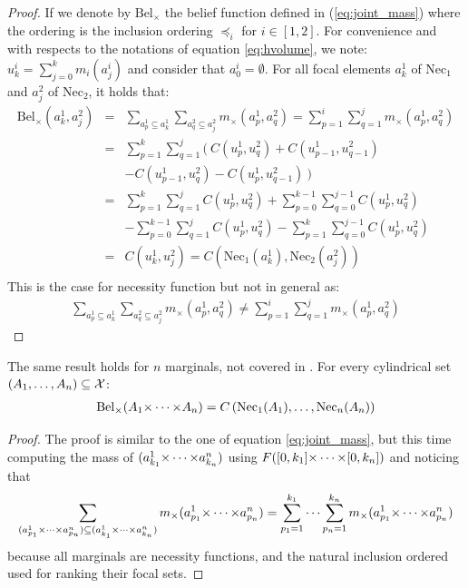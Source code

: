 \begin{proof}
    If we denote by $\mathrm{Bel}_\times$ the belief function defined in (\ref{eq:joint_mass}) where the ordering is the inclusion ordering $\preceq_i$ for $i\in[1,2]$. For convenience and with respects to the notations of equation \ref{eq:hvolume}, we note: $u^i_k=\sum_{j=0}^{k}m_i(a_j^i)$ and consider that $a^i_0=\emptyset$.
    For all focal elements $a_k^1$ of $\mathrm{Nec}_1$ and $a^2_j$ of $\mathrm{Nec}_2$, it holds that:
    \begin{eqnarray*}
        \mathrm{Bel}_\times(a^1_k, a^2_j) &=& \sum_{a^1_p\subseteq a_k^1}\sum_{a^2_q\subseteq a_j^2}m_\times(a^1_p, a^2_q) = \sum_{p=1}^i\sum_{q=1}^j m_\times(a^1_p, a^2_q)\\
        &=&\sum_{p=1}^k\sum_{q=1}^j (~C(u^1_p, u^2_q) + C(u^1_{p-1}, u^2_{q-1}) \\
        &&- C(u^1_{p-1}, u^2_{q}) - C(u^1_{p}, u^2_{q-1})~)\\
        &=&\sum_{p=1}^k\sum_{q=1}^jC(u^1_p, u^2_q) + \sum_{p=0}^{k-1}\sum_{q=0}^{j-1}C(u^1_p, u^2_q) \\
        &&- \sum_{p=0}^{k-1}\sum_{q=1}^jC(u^1_p, u^2_q) - \sum_{p=1}^k\sum_{q=0}^{j-1}C(u^1_p, u^2_q)\\
        &=& C(u^1_k, u^2_j) = C\left(\mathrm{Nec}_1(a_k^1), \mathrm{Nec}_2(a_j^2)\right)\\
    \end{eqnarray*}
    This is the case for necessity function but not in general as:
    \begin{eqnarray*}
        \sum_{a^1_p\subseteq a_k^1}\sum_{a^2_q\subseteq a_j^2}m_\times(a^1_p, a^2_q) \neq \sum_{p=1}^i\sum_{q=1}^j m_\times(a^1_p, a^2_q)
    \end{eqnarray*}
\end{proof}

The same result holds for $n$ marginals, not covered in \cite{schmelzer_sklars_2015}. For every cylindrical set $(A_1, \dots, A_n)\subseteq{\mathcal{X}}$:
\begin{eqnarray}
    \mathrm{Bel}_\times(A_1{\times\dots\times} A_n) = C\left(\mathrm{Nec}_1(A_1), \dots, \mathrm{Nec}_n(A_n)\right)
\end{eqnarray}

\begin{proof}
    The proof is similar to the one of equation \ref{eq:joint_mass}, but this time computing the mass of $(a_{k_1}^1{\times\dots\times} a_{k_n}^n)$ using $F([0,k_1]{\times\dots\times}[0,k_n])$ and noticing that \begin{eqnarray*}
        \sum_{(a^1_{p_1}{\times\dots\times} a^n_{p_n})\subseteq(a^1_{k_1}{\times\dots\times} a^n_{k_n})}m_\times(a^1_{p_1}{\times\dots\times} a^n_{p_n})=\sum_{p_1=1}^{k_1}\dots\sum_{p_n=1}^{k_n} m_\times(a^1_{p_1}{\times\dots\times} a^n_{p_n})
    \end{eqnarray*} because all marginals are necessity functions, and the natural inclusion ordered used for ranking their focal sets.
\end{proof}

